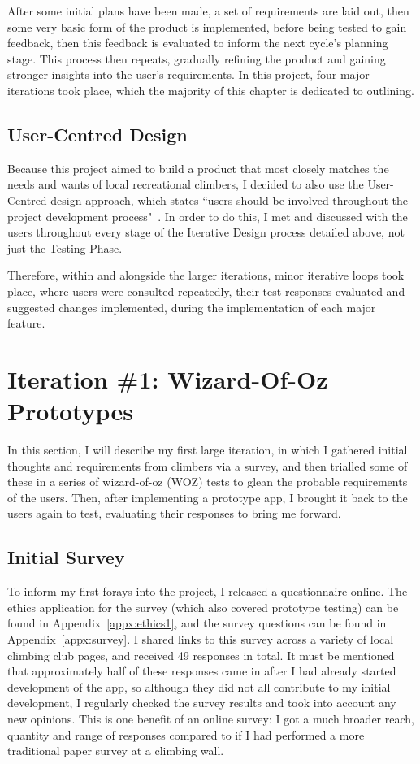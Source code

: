 After some initial plans have been made, a set of requirements are laid out, then some very basic form of the product is implemented, before being tested to gain feedback, then this feedback is evaluated to inform the next cycle's planning stage.
This process then repeats, gradually refining the product and gaining stronger insights into the user's requirements.
In this project, four major iterations took place, which the majority of this chapter is dedicated to outlining.


\subsection{User-Centred Design}
Because this project aimed to build a product that most closely matches the needs and wants of local recreational climbers, I decided to also use the User-Centred design approach, which states ``users should be involved throughout the project development
process"~\cite{ISO9241-210}.
In order to do this, I met and discussed with the users throughout every stage of the Iterative Design process detailed above, not just the Testing Phase.

Therefore, within and alongside the larger iterations, minor iterative loops took place, where users were consulted repeatedly, their test-responses evaluated and suggested changes implemented, during the implementation of each major feature.



\section{Iteration \#1: Wizard-Of-Oz Prototypes}
In this section, I will describe my first large iteration, in which I gathered initial thoughts and requirements from climbers via a survey, and then trialled some of these in a series of wizard-of-oz (WOZ) tests to glean the probable requirements of the users.
Then, after implementing a prototype app, I brought it back to the users again to test, evaluating their responses to bring me forward.


\subsection{Initial Survey}
To inform my first forays into the project, I released a questionnaire online.
The ethics application for the survey (which also covered prototype testing) can be found in Appendix~\ref{appx:ethics1}, and the survey questions can be found in Appendix~\ref{appx:survey}.
I shared links to this survey across a variety of local climbing club pages, and received 49 responses in total. 
It must be mentioned that approximately half of these responses came in after I had already started development of the app, so although they did not all contribute to my initial development, I regularly checked the survey results and took into account any new opinions.
This is one benefit of an online survey: I got a much broader reach, quantity and range of responses compared to if I had performed a more traditional paper survey at a climbing wall.


